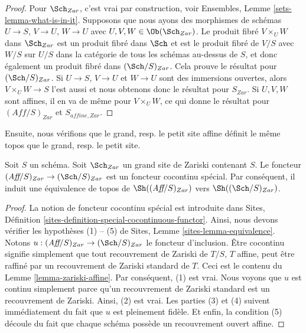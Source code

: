 \begin{proof}
Pour $\Sch_{Zar}$, c'est vrai par construction, voir Ensembles, Lemme \ref{sets-lemma-what-is-in-it}. Supposons que nous ayons des morphismes de schémas $U \to S$, $V \to U$, $W \to U$ avec $U, V, W \in \Ob(\Sch_{Zar})$. Le produit fibré $V \times_U W$ dans $\Sch_{Zar}$ est un produit fibré dans $\Sch$ et est le produit fibré de $V/S$ avec $W/S$ sur $U/S$ dans la catégorie de tous les schémas au-dessus de $S$, et donc également un produit fibré dans $(\Sch/S)_{Zar}$. Cela prouve le résultat pour $(\Sch/S)_{Zar}$. Si $U \to S$, $V \to U$ et $W \to U$ sont des immersions ouvertes, alors $V \times_U W \to S$ l'est aussi et nous obtenons donc le résultat pour $S_{Zar}$. Si $U, V, W$ sont affines, il en va de même pour $V \times_U W$, ce qui donne le résultat pour $(\textit{Aff}/S)_{Zar}$ et $S_{affine, Zar}$.
\end{proof}

\noindent
Ensuite, nous vérifions que le grand, resp. le petit site affine définit le même topos que le grand, resp. le petit site.

\begin{lemma}
\label{lemma-affine-big-site-Zariski}
Soit $S$ un schéma. Soit $\Sch_{Zar}$ un grand site de Zariski contenant $S$. Le foncteur $(\textit{Aff}/S)_{Zar} \to (\Sch/S)_{Zar}$ est un foncteur cocontinu spécial. Par conséquent, il induit une équivalence de topos de $\Sh((\textit{Aff}/S)_{Zar})$ vers $\Sh((\Sch/S)_{Zar})$.
\end{lemma}

\begin{proof}
La notion de foncteur cocontinu spécial est introduite dans Sites, Définition \ref{sites-definition-special-cocontinuous-functor}. Ainsi, nous devons vérifier les hypothèses (1) -- (5) de Sites, Lemme \ref{sites-lemma-equivalence}. Notons $u : (\textit{Aff}/S)_{Zar} \to (\Sch/S)_{Zar}$ le foncteur d'inclusion. Être cocontinu signifie simplement que tout recouvrement de Zariski de $T/S$, $T$ affine, peut être raffiné par un recouvrement de Zariski standard de $T$. Ceci est le contenu du Lemme \ref{lemma-zariski-affine}. Par conséquent, (1) est vrai. Nous voyons que $u$ est continu simplement parce qu'un recouvrement de Zariski standard est un recouvrement de Zariski. Ainsi, (2) est vrai. Les parties (3) et (4) suivent immédiatement du fait que $u$ est pleinement fidèle. Et enfin, la condition (5) découle du fait que chaque schéma possède un recouvrement ouvert affine.
\end{proof}


